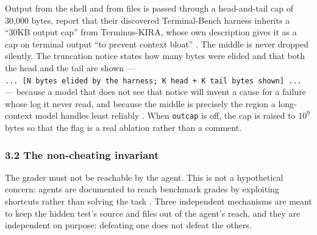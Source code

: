 \documentclass[
  10pt,
  a4paper,
]{article}
\let\oldtexttt\texttt
\renewcommand{\texttt}[1]{{\small\oldtexttt{#1}}}
\begin{document}
Output from the shell and from files is passed through a head-and-tail
cap of 30,000 bytes. \citet[App. B.3]{lee2026metaharness} report that
their discovered Terminal-Bench harness inherits a ``30KB output cap''
from Terminus-KIRA, whose own description gives it as a cap on terminal
output ``to prevent context bloat'' \citep{krafton2026kira}. The middle
is never dropped silently. The truncation notice states how many bytes
were elided and that both the head and the tail are shown ---
\texttt{...\ {[}N\ bytes\ elided\ by\ the\ harness;\ K\ head\ +\ K\ tail\ bytes\ shown{]}\ ...}
--- because a model that does not see that notice will invent a cause
for a failure whose log it never read, and because the middle is
precisely the region a long-context model handles least reliably
\citep{liu2024lost}. When \texttt{outcap} is off, the cap is raised to
\(10^9\) bytes so that the flag is a real ablation rather than a
comment.

\subsubsection{3.2 The non-cheating
invariant}\label{the-non-cheating-invariant}

The grader must not be reachable by the agent. This is not a
hypothetical concern: agents are documented to reach benchmark grades by
exploiting shortcuts rather than solving the task
\citep{aleithan2024swebenchplus, lodkaew2026deceive, kouremetis2026cheats}.
Three independent mechanisms are meant to keep the hidden test's source
and files out of the agent's reach, and they are independent on purpose:
defeating one does not defeat the others.
\end{document}
